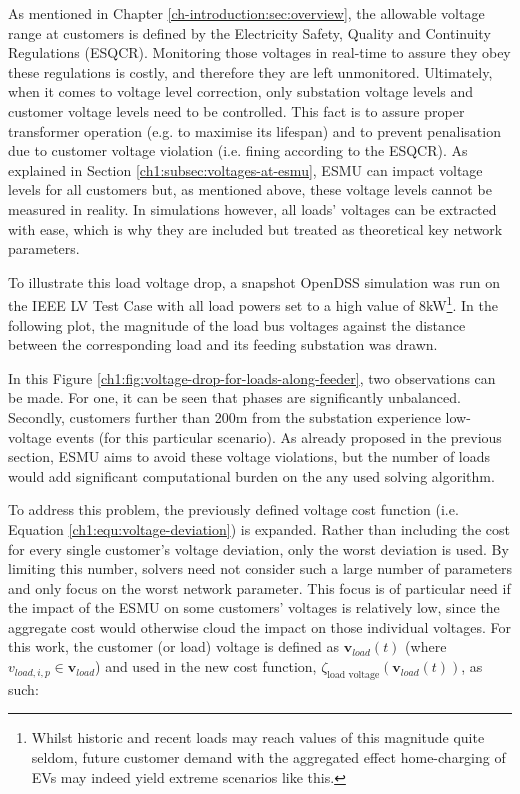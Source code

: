 As mentioned in Chapter \ref{ch-introduction:sec:overview}, the allowable voltage range at customers is defined by the Electricity Safety, Quality and Continuity Regulations (ESQCR).
Monitoring those voltages in real-time to assure they obey these regulations is costly, and therefore they are left unmonitored.
Ultimately, when it comes to voltage level correction, only substation voltage levels and customer voltage levels need to be controlled.
This fact is to assure proper transformer operation (e.g. to maximise its lifespan) and to prevent penalisation due to customer voltage violation (i.e. fining according to the ESQCR).
As explained in Section \ref{ch1:subsec:voltages-at-esmu}, ESMU can impact voltage levels for all customers but, as mentioned above, these voltage levels cannot be measured in reality.
In simulations however, all loads' voltages can be extracted with ease, which is why they are included but treated as theoretical key network parameters.

To illustrate this load voltage drop, a snapshot OpenDSS simulation was run on the IEEE LV Test Case with all load powers set to a high value of 8kW\footnote[1]{Whilst historic and recent loads may reach values of this magnitude quite seldom, future customer demand with the aggregated effect home-charging of EVs may indeed yield extreme scenarios like this.}.
In the following plot, the magnitude of the load bus voltages against the distance between the corresponding load and its feeding substation was drawn.



In this Figure \ref{ch1:fig:voltage-drop-for-loads-along-feeder}, two observations can be made.
For one, it can be seen that phases are significantly unbalanced.
Secondly, customers further than 200m from the substation experience low-voltage events (for this particular scenario).
As already proposed in the previous section, ESMU aims to avoid these voltage violations, but the number of loads would add significant computational burden on the any used solving algorithm.

To address this problem, the previously defined voltage cost function (i.e. Equation \ref{ch1:equ:voltage-deviation}) is expanded.
Rather than including the cost for every single customer's voltage deviation, only the worst deviation is used.
By limiting this number, solvers need not consider such a large number of parameters and only focus on the worst network parameter.
This focus is of particular need if the impact of the ESMU on some customers' voltages is relatively low, since the aggregate cost would otherwise cloud the impact on those individual voltages.
For this work, the customer (or load) voltage is defined as $\textbf{v}_{load}(t)$ (where $v_{load,i,p} \in \textbf{v}_{load}$) and used in the new cost function, $\zeta_\text{load voltage}(\textbf{v}_{load}(t))$, as such:

